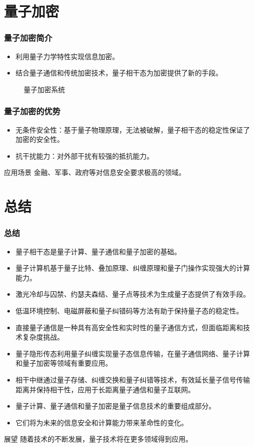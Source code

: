 \section{量子加密}
\begin{frame}
    \frametitle{量子加密简介}
    \begin{itemize}
        \item 利用量子力学特性实现信息加密。
        \item 结合量子通信和传统加密技术，量子相干态为加密提供了新的手段。
    \end{itemize}
    \begin{figure}
        \centering
        \caption{量子加密系统}
    \end{figure}
\end{frame}

\begin{frame}
    \frametitle{量子加密的优势}
    \begin{itemize}
        \item 无条件安全性：基于量子物理原理，无法被破解，量子相干态的稳定性保证了加密的安全性。
        \item 抗干扰能力：对外部干扰有较强的抵抗能力。
    \end{itemize}
    \begin{exampleblock}{应用场景}
        金融、军事、政府等对信息安全要求极高的领域。
    \end{exampleblock}
\end{frame}

\section{总结}
\begin{frame}
    \frametitle{总结}
    \begin{itemize}
        \item 量子相干态是量子计算、量子通信和量子加密的基础。
        \item 量子计算机基于量子比特、叠加原理、纠缠原理和量子门操作实现强大的计算能力。
        \item 激光冷却与囚禁、约瑟夫森结、量子点等技术为生成量子态提供了有效手段。
        \item 低温环境控制、电磁屏蔽和量子纠错码等方法有助于保持量子态的稳定性。
        \item 直接量子通信是一种具有高安全性和实时性的量子通信方式，但面临距离和技术复杂度挑战。
        \item 量子隐形传态利用量子纠缠实现量子态信息传输，在量子通信网络、量子计算和量子加密等领域有重要应用。
        \item 相干中继通过量子存储、纠缠交换和量子纠错等技术，有效延长量子信号传输距离并保持相干性，应用于长距离量子通信和量子互联网。
        \item 量子计算、量子通信和量子加密是量子信息技术的重要组成部分。
        \item 它们将为未来的信息安全和计算能力带来革命性的变化。
    \end{itemize}
    \begin{block}{展望}
        随着技术的不断发展，量子技术将在更多领域得到应用。
    \end{block}
\end{frame}
